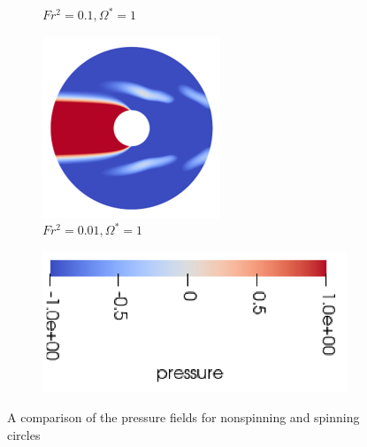\begin{figure}
\begin{subfigure}[b]{0.25\textwidth}
        \caption{$Fr^2 = 0.1, \Omega^{\ast} = 1$}
        \label{fig:ps1fs0p1}
    \end{subfigure}
    \hfill
    \begin{subfigure}[b]{0.25\textwidth}
        \centering
        \includegraphics[width=\textwidth]{images/circle/ps1fs0p01.png}
        \caption{$Fr^2 = 0.01, \Omega^{\ast} = 1$}
        \label{fig:ps1fs0p01}
    \end{subfigure}
    
    \begin{subfigure}[b]{0.25\textwidth}
        \centering
        \includegraphics[width=\textwidth]{images/circle/p_scale.png}
        \caption*{}
    \end{subfigure}
    
    \caption{A comparison of the pressure fields for nonspinning and spinning circles}
    \label{fig:circle_pressure}
\end{figure}
\clearpage

